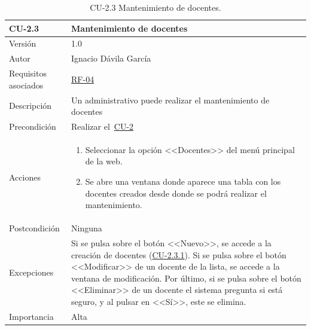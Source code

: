 \begin{table}[p]
	\centering
	\begin{tabularx}{\linewidth}{ p{} p{} }
		\toprule
		\textbf{CU-2.3}    & \textbf{Mantenimiento de docentes}\\
		\toprule
		{\small Versión}              & 1.0    \\
		{\small Autor}                & Ignacio Dávila García \\
		{\small Requisitos asociados} & \hyperref[itm:RF4]{RF-04} \\
		{\small Descripción}          & Un administrativo puede realizar el mantenimiento de docentes \\
		{\small Precondición}         & Realizar el~\hyperref[table:CU-2]{CU-2} \\
		{\small Acciones}             &
		\begin{enumerate}
			\def\labelenumi{\arabic{enumi}.}
			\tightlist
			\item Seleccionar la opción <<Docentes>> del menú principal de la web.
			\item Se abre una ventana donde aparece una tabla con los docentes creados desde donde se podrá realizar el mantenimiento.
		\end{enumerate}\\
		{\small Postcondición}        & Ninguna \\
		{\small Excepciones}          & Si se pulsa sobre el botón <<Nuevo>>, se accede a la creación de docentes (\hyperref[table:CU-2_3_1]{CU-2.3.1}). Si se pulsa sobre el botón <<Modificar>> de un docente de la lista, se accede a la ventana de modificación. Por último, si se pulsa sobre el botón <<Eliminar>> de un docente el sistema pregunta si está seguro, y al pulsar en <<Sí>>, este se elimina. \\
		{\small Importancia}          & Alta \\
		\bottomrule
	\end{tabularx}
	\caption{CU-2.3 Mantenimiento de docentes.}\label{table:CU-2_3}
\end{table}
\FloatBarrier

